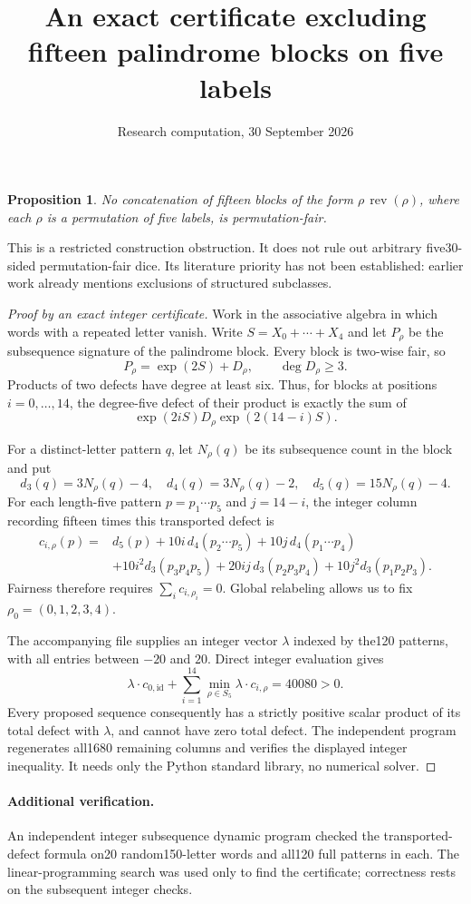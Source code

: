 \documentclass[11pt]{article}
\title{An exact certificate excluding fifteen palindrome blocks on five labels}
\author{Research computation, 30 September 2026}
\date{}
\newtheorem{proposition}{Proposition}
\begin{document}
\maketitle

\begin{proposition}
No concatenation of fifteen blocks of the form
$\rho\,\operatorname{rev}(\rho)$, where each $\rho$ is a permutation
of five labels, is permutation-fair.
\end{proposition}

This is a restricted construction obstruction. It does not rule out
arbitrary five30-sided permutation-fair dice. Its literature priority
has not been established: earlier work already mentions exclusions of
structured subclasses.

\begin{proof}[Proof by an exact integer certificate]
Work in the associative algebra in which words with a repeated letter
vanish. Write $S=X_0+\cdots+X_4$ and let $P_\rho$ be the subsequence
signature of the palindrome block. Every block is two-wise fair, so
\[
 P_\rho=\exp(2S)+D_\rho,\qquad \deg D_\rho\ge3.
\]
Products of two defects have degree at least six. Thus, for blocks at
positions $i=0,\ldots,14$, the degree-five defect of their product is
exactly the sum of
\[
 \exp(2iS)D_\rho\exp(2(14-i)S).
\]

For a distinct-letter pattern $q$, let $N_\rho(q)$ be its subsequence
count in the block and put
\[
 d_3(q)=3N_\rho(q)-4,\quad
 d_4(q)=3N_\rho(q)-2,\quad
 d_5(q)=15N_\rho(q)-4.
\]
For each length-five pattern $p=p_1\cdots p_5$ and $j=14-i$, the
integer column recording fifteen times this transported defect is
\begin{align*}
 c_{i,\rho}(p)={}&d_5(p)+10i\,d_4(p_2\cdots p_5)
   +10j\,d_4(p_1\cdots p_4)\\
 &+10i^2d_3(p_3p_4p_5)+20ij\,d_3(p_2p_3p_4)
   +10j^2d_3(p_1p_2p_3).
\end{align*}
Fairness therefore requires $\sum_i c_{i,\rho_i}=0$.
Global relabeling allows us to fix $\rho_0=(0,1,2,3,4)$.

The accompanying file  supplies an integer
vector $\lambda$ indexed by the120 patterns, with all entries between
$-20$ and $20$. Direct integer evaluation gives
\[
 \lambda\cdot c_{0,\mathrm{id}}
   +\sum_{i=1}^{14}\min_{\rho\in S_5}
                      \lambda\cdot c_{i,\rho}=40080>0.
\]
Every proposed sequence consequently has a strictly positive scalar
product of its total defect with $\lambda$, and cannot have zero total
defect. The independent program
 regenerates all1680 remaining
columns and verifies the displayed integer inequality. It needs only
the Python standard library, no numerical solver.
\end{proof}

\paragraph{Additional verification.}
An independent integer subsequence dynamic program checked the
transported-defect formula on20 random150-letter words and all120 full
patterns in each. The linear-programming search was used only to find
the certificate; correctness rests on the subsequent integer checks.
\end{document}
